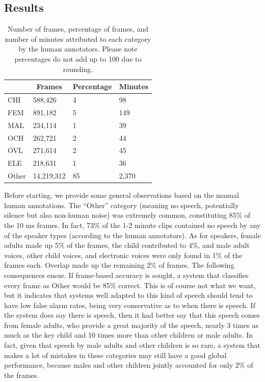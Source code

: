 \documentclass[english,table,man,floatsintext]{apa6}
\begin{document}
\hypertarget{results}{%
\subsection{Results}\label{results}}

\begin{table}[tbp]

\begin{center}
\begin{threeparttable}

\caption{\label{tab:tabprops}Number of frames, percentage of frames, and number of minutes attributed to each category by the human annotators. Please note percentages do not add up to 100 due to rounding.}

\begin{tabular}{llll}
\toprule
 & \multicolumn{1}{c}{Frames} & \multicolumn{1}{c}{Percentage} & \multicolumn{1}{c}{Minutes}\\
\midrule
CHI & 588,426 & 4 & 98\\
FEM & 891,182 & 5 & 149\\
MAL & 234,114 & 1 & 39\\
OCH & 262,721 & 2 & 44\\
OVL & 271,614 & 2 & 45\\
ELE & 218,631 & 1 & 36\\
Other & 14,219,312 & 85 & 2,370\\
\bottomrule
\end{tabular}

\end{threeparttable}
\end{center}

\end{table}

Before starting, we provide some general observations based on the manual human annotations. The \enquote{Other} category (meaning no speech, potentially silence but also non-human noise) was extremely common, constituting 85\% of the 10 ms frames. In fact, 73\% of the 1-2 minute clips contained no speech by any of the speaker types (according to the human annotators). As for speakers, female adults made up 5\% of the frames, the child contributed to 4\%, and male adult voices, other child voices, and electronic voices were only found in 1\% of the frames each. Overlap made up the remaining 2\% of frames. The following consequences ensue. If frame-based accuracy is sought, a system that classifies every frame as Other would be 85\% correct. This is of course not what we want, but it indicates that systems well adapted to this kind of speech should tend to have low false alarm rates, being very conservative as to when there is speech. If the system does say there is speech, then it had better say that this speech comes from female adults, who provide a great majority of the speech, nearly 3 times as much as the key child and 10 times more than other children or male adults. In fact, given that speech by male adults and other children is so rare, a system that makes a lot of mistakes in these categories may still have a good global performance, because males and other children jointly accounted for only 2\% of the frames.
\end{document}
